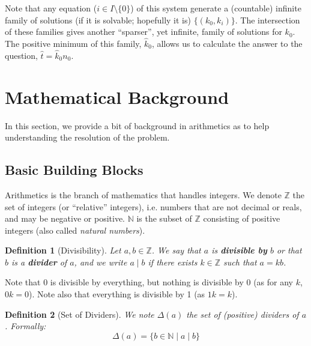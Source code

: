 \documentclass{article}
\newtheorem{definition}{Definition}
\newcommand{\divi}{\mathbin{\mid}}
\begin{document}
Note that any equation ($i \in I \setminus \{ 0 \}$) of this system generate a (countable) infinite family of solutions (if it is solvable; hopefully it is) $\{ (k_0,k_i) \}$. The intersection of these families gives another ``sparser'', yet infinite, family of solutions for $k_0$. The positive minimum of this family, $\hat k_0$, allows us to calculate the answer to the question, $\hat t = \hat k_0 n_0$.


\section{Mathematical Background}

In this section, we provide a bit of background in arithmetics as to help understanding the resolution of the problem.

\subsection{Basic Building Blocks}

Arithmetics is the branch of mathematics that handles integers. We denote $\mathbb{Z}$ the set of integers (or ``relative'' integers), i.e. numbers that are not decimal or reals, and may be negative or positive. $\mathbb{N}$ is the subset of $\mathbb{Z}$ consisting of positive integers (also called \textit{natural numbers}).

\begin{definition}[Divisibility]
Let $a,b \in \mathbb{Z}$. We say that $a$ is \textbf{divisible by} $b$ or that $b$ is a \textbf{divider} of $a$, and we write $a \divi b$ if there exists $k \in \mathbb{Z}$ such that $a = k b$.
\end{definition}

Note that 0 is divisible by everything, but nothing is divisible by 0 (as for any $k$, $0 k = 0$). Note also that everything is divisible by 1 (as $1 k = k$).

\begin{definition}[Set of Dividers]
We note $\Delta(a)$ the set of (positive) dividers of $a$. Formally:
$$\Delta(a) = \{ b \in \mathbb{N} \mid a \divi b \}$$
\end{definition}
\end{document}
